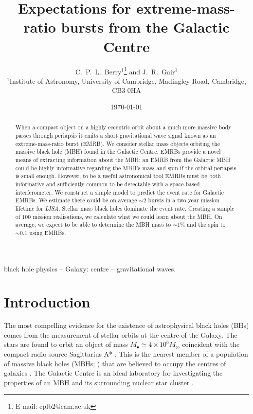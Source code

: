 \documentclass[useAMS,usedcolumn,usegraphicx,usenatbib]{mn2e}
\title[Expectations for EMRBs from the GC]{Expectations for extreme-mass-ratio bursts from the Galactic Centre}
\author[C.\ P.\ L.\ Berry and J.\ R.\ Gair]{C.\ P.\ L.\ Berry$^{1}$\thanks{E-mail:
cplb2@cam.ac.uk}  and J.\ R.\ Gair$^{1}$\\
$^{1}$Institute of Astronomy, University of Cambridge, Madingley Road, Cambridge, CB3 0HA}
\begin{document}
\date{\today}

\pagerange{\pageref{firstpage}--\pageref{lastpage}} 

\maketitle

\label{firstpage}

\begin{abstract}
When a compact object on a highly eccentric orbit about a much more massive body passes through periapsis it emits a short gravitational wave signal known as an extreme-mass-ratio burst (EMRB). We consider stellar mass objects orbiting the massive black hole (MBH) found in the Galactic Centre. EMRBs provide a novel means of extracting information about the MBH; an EMRB from the Galactic MBH could be highly informative regarding the MBH's mass and spin if the orbital periapsis is small enough. However, to be a useful astronomical tool EMRBs must be both informative and sufficiently common to be detectable with a space-based interferometer. We construct a simple model to predict the event rate for Galactic EMRBs. We estimate there could be on average $\sim 2$ bursts in a two year mission lifetime for {\textit{LISA}}. Stellar mass black holes dominate the event rate. Creating a sample of $100$ mission realisations, we calculate what we could learn about the MBH. On average, we expect to be able to determine the MBH mass to $\sim1\%$ and the spin to $\sim0.1$ using EMRBs.
\end{abstract}

\begin{keywords}
black hole physics -- Galaxy: centre -- gravitational waves. %
\end{keywords}

\section{Introduction}

The most compelling evidence for the existence of astrophysical black holes (BHs) comes from the measurement of stellar orbits at the centre of the Galaxy. The stars are found to orbit an object of mass $M_\bullet \simeq 4 \times 10^6 M_\odot$ coincident with the compact radio source Sagittarius A* \citep{Reid2004, Ghez2008, Gillessen2009, Meyer2012}. This is the nearest member of a population of massive black holes (MBHs; \citealt{Volonteri2010}) that are believed to occupy the centres of galaxies \citep{Lynden-Bell1969, Rees1984, Ferrarese2005}. The Galactic Centre is an ideal laboratory for investigating the properties of an MBH and its surrounding nuclear star cluster \citep{Genzel2010}.
\end{document}
